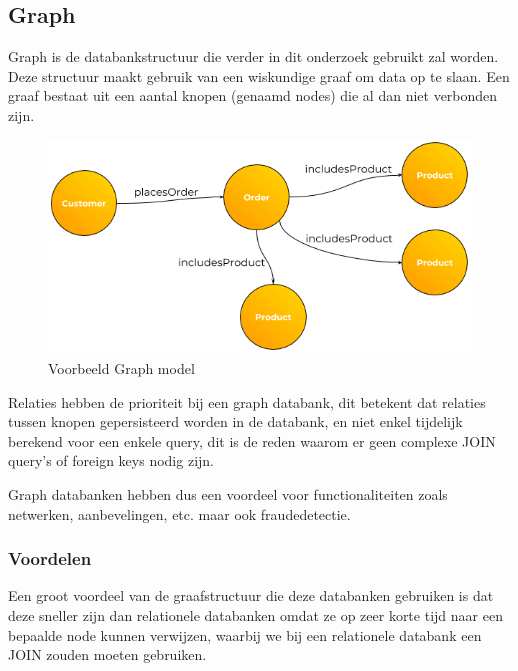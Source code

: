 \subsection{Graph}
\label{sec:Graph}

Graph is de databankstructuur die verder in dit onderzoek gebruikt zal worden. Deze structuur maakt gebruik van een wiskundige graaf om data op te slaan. Een graaf bestaat uit een aantal knopen (genaamd nodes) die al dan niet verbonden zijn. 

\begin{figure} [ht]
	\centering
\includegraphics[width=\linewidth]{img/Customer-Order-Example-Graph.png}
	\caption[Voorbeeld Graph model]{Voorbeeld Graph model}
	\label{fig:GraphModelExample}
\end{figure}


Relaties hebben de prioriteit bij een graph databank, dit betekent dat relaties tussen knopen gepersisteerd worden in de databank, en niet enkel tijdelijk berekend voor een enkele query, dit is de reden waarom er geen complexe JOIN query's of foreign keys nodig zijn.

Graph databanken hebben dus een voordeel voor functionaliteiten zoals netwerken, aanbevelingen, etc. maar ook fraudedetectie. 

\subsubsection{Voordelen}
\label{subsec:Voordelen Graph}

Een groot voordeel van de graafstructuur die deze databanken gebruiken is dat deze sneller zijn dan relationele databanken omdat ze op zeer korte tijd naar een bepaalde node kunnen verwijzen, waarbij we bij een relationele databank een JOIN zouden moeten gebruiken. 

